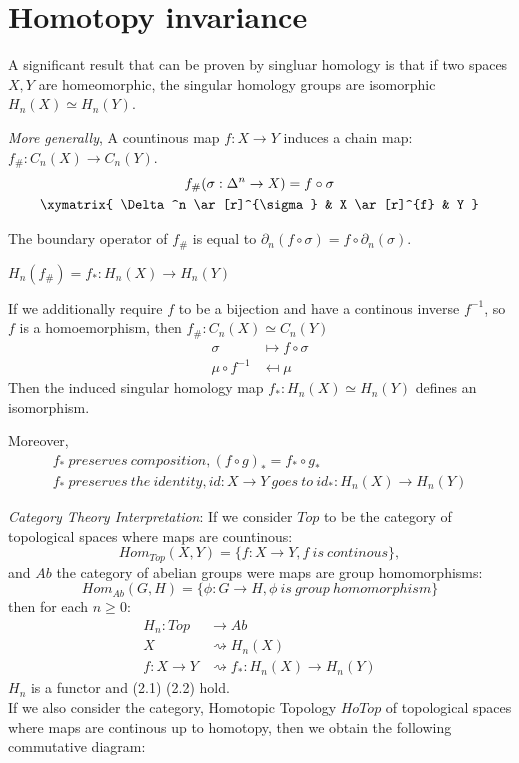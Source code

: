 \documentclass[11pt,a4paper]{report}
\begin{document}
    
    \section{Homotopy invariance}
    
    A significant result that can be proven by singluar homology is that if two spaces $X, Y$ are homeomorphic, the singular homology groups are isomorphic $ H_n(X) \simeq H_n(Y)$.
    
    \emph{More generally}, 
    A countinous map $f: X \rightarrow Y$ induces a chain map: $f_\#: C_n(X) \rightarrow C_n(Y)$.
    \begin{gather*}
        f_\#(\sigma: \Delta^ n \rightarrow X) = f \circ \sigma \\
                    \xymatrix{
                        \Delta^n  \ar[r]^{\sigma} & 
                        X  \ar[r]^{f} & Y  }
    \end{gather*}
    
    The boundary operator of $f_\#$ is equal to $\partial_n(f \circ \sigma) = f \circ \partial_n(\sigma)$. 
    
    $H_n(f_\#) = f_*: H_n(X) \rightarrow H_n(Y)$ \\
    
    \par
    If we additionally require $f$ to be a bijection and have a continous inverse $f^{-1}$, so $f$ is a homoemorphism, then $f_\#: C_n(X) \simeq C_n(Y)$
    \begin{align*}
        \sigma &\mapsto f \circ \sigma \\
        \mu \circ f^{-1} &\mapsfrom \mu  
    \end{align*}
    Then the induced singular homology map $f_*: H_n(X) \simeq H_n(Y)$ defines an isomorphism.
    
    Moreover,
    \begin{gather}
        f_* \ preserves \ composition, (f \circ g)_* = f_* \circ g_* \\
        f_* \ preserves \ the \ identity, id: X \rightarrow Y \ goes \ to \ id_*:  H_n(X) \rightarrow H_n(Y)
    \end{gather}
    
    \emph{Category Theory Interpretation}: \label{functoriality} If we consider $Top$ to be the category of topological spaces where maps are countinous:
    \[{Hom}_{Top}(X, Y) = \{f: X \rightarrow Y, f \ is \ continous\},\] and $Ab$ the category of abelian groups were maps are group homomorphisms: \[{Hom}_{Ab}(G, H) = \{\phi: G \rightarrow H, \phi \ is \ group \ homomorphism\}\] then for each $n \geq 0$: 
     \begin{align*}
        H_n: Top &\rightarrow Ab \\
            X &\rightsquigarrow H_n(X) \\
        f: X \rightarrow Y &\rightsquigarrow f_*:  H_n(X) \rightarrow H_n(Y) 
    \end{align*}
    $H_n$ is a functor and (2.1) (2.2) hold.  \\
    If we also consider the category, Homotopic Topology $HoTop$ of topological spaces where maps are continous up to homotopy, then we obtain the following commutative diagram: 
    
\end{document}
